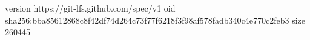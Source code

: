 version https://git-lfs.github.com/spec/v1
oid sha256:bba85612868c8f42df74d264c73f77f6218f3f98af578fadb340c4e770c2feb3
size 260445
